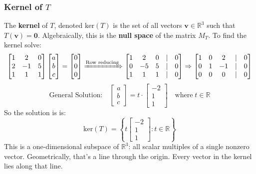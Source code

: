 \documentclass[a4paper, 9pt]{extarticle}
\begin{document}
\subsubsection{Kernel of $T$}
The \textbf{kernel} of $T$, denoted $\text{ker}(T)$ is the set of all vectors $\mathbf{v} \in \mathbb{R}^3$ such that $T(\mathbf{v}) = \mathbf{0}$. Algebraically, this is the \textbf{null space} of the matrix $M_T$. To find the kernel solve:
$$
  \begin{bmatrix}
    1 & 2  & 0 \\
    2 & -1 & 5 \\
    1 & 1  & 1
  \end{bmatrix}
  \begin{bmatrix}
    a \\
    b \\
    c
  \end{bmatrix}
  =
  \begin{bmatrix}
    0 \\
    0 \\
    0
  \end{bmatrix}
  \xRightarrow[]{\text{Row reducing}}
  \begin{bmatrix}
    1 & 2  & 0 & | & 0 \\
    0 & -5 & 5 & | & 0 \\
    1 & 1  & 1 & | & 0
  \end{bmatrix}
  \Rightarrow
  \begin{bmatrix}
    1 & 0 & 2  & | & 0 \\
    0 & 1 & -1 & | & 0 \\
    0 & 0 & 0  & | & 0
  \end{bmatrix}
$$
$$
  \text{General Solution:} \quad
  \begin{bmatrix}
    a \\
    b \\
    c
  \end{bmatrix}
  =
  t \cdot
  \begin{bmatrix}
    -2 \\
    1  \\
    1
  \end{bmatrix}
  \quad \text{where} \; t \in \mathbb{R}
$$
So the solution is is:
$$\text{ker}(T) =
  \left \{
  t
  \begin{bmatrix}
    -2 \\
    1  \\
    1
  \end{bmatrix}
  : t \in \mathbb{R}
  \right \}$$
This is a one-dimensional subspace of $\mathbb{R}^3$: all scalar multiples of a single nonzero vector. Geometrically, that's a line through the origin. Every vector in the kernel lies along that line.
\end{document}
